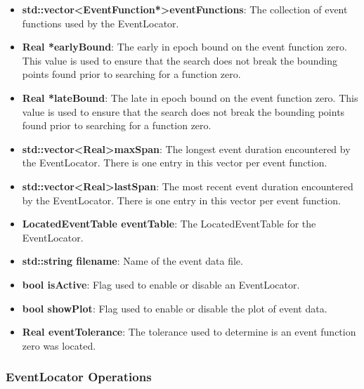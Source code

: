 \documentclass[letterpaper,10pt]{article}
\begin{document}
\begin{itemize}
\item \textbf{std::vector\textless EventFunction*\textgreater eventFunctions}:
The collection of event functions used by the EventLocator.
\item \textbf{Real *earlyBound}: The early in epoch bound on the event function zero.  This value is used to ensure that the search does not break the bounding points found prior to searching for a function zero.
\item \textbf{Real *lateBound}: The late in epoch bound on the event function zero.  This value is used to ensure that the search does not break the bounding points found prior to searching for a function zero.
\item \textbf{std::vector\textless Real\textgreater  maxSpan}: The longest event
duration encountered by the EventLocator.  There is one entry in this vector per
event function.
\item \textbf{std::vector\textless Real\textgreater  lastSpan}: The most recent
event duration encountered by the EventLocator.  There is one entry in this
vector per event function.
\item \textbf{LocatedEventTable eventTable}: The LocatedEventTable for the
EventLocator.
\item \textbf{std::string filename}: Name of the event data file.
\item \textbf{bool isActive}: Flag used to enable or disable an EventLocator.
\item \textbf{bool showPlot}: Flag used to enable or disable the plot of event data.
\item \textbf{Real eventTolerance}: The tolerance used to determine is an event function zero was located.
\end{itemize}

\subsubsection{EventLocator Operations}
\end{document}
